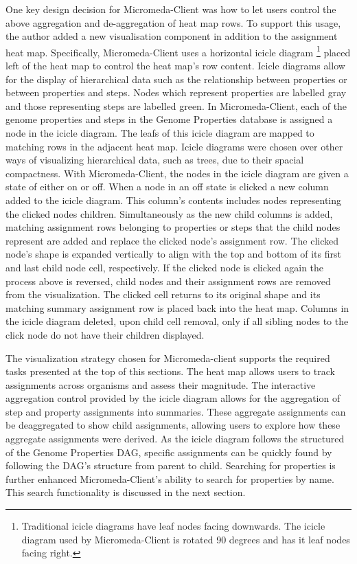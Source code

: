 One key design decision for Micromeda-Client was how to let users control the above aggregation and de-aggregation of heat map rows. To support this usage, the author added a new visualisation component in addition to the assignment heat map. Specifically, Micromeda-Client uses a horizontal icicle diagram \footnote{Traditional icicle diagrams have leaf nodes facing downwards. The icicle diagram used by Micromeda-Client is rotated 90 degrees and has it leaf nodes facing right.} placed left of the heat map to control the heat map's row content. Icicle diagrams allow for the display of hierarchical data such as the relationship between properties or between properties and steps. Nodes which represent properties are labelled gray and those representing steps are labelled green. In Micromeda-Client, each of the genome properties and  steps in the Genome Properties database is assigned a node in the icicle diagram. The leafs of this icicle diagram are mapped to matching rows in the adjacent heat map. Icicle diagrams were chosen over other ways of visualizing hierarchical data, such as trees, due to their spacial compactness. With Micromeda-Client, the nodes in the icicle diagram are given a state of either on or off. When a node in an off state is clicked a new column added to the icicle diagram. This column's contents includes nodes representing the clicked nodes children. Simultaneously as the new child columns is added, matching assignment rows belonging to properties or steps that the child nodes represent are added and replace the clicked node's assignment row. The clicked node's shape is expanded vertically to align with the top and bottom of its first and last child node cell, respectively. If the clicked node is clicked again the process above is reversed, child nodes and their assignment rows are removed from the visualization. The clicked cell returns to its original shape and its matching summary assignment row is placed back into the heat map. Columns in the icicle diagram deleted, upon child cell removal, only if all sibling nodes to the click node do not have their children displayed.

The visualization strategy chosen for Micromeda-client supports the required tasks presented at the top of this sections. The heat map allows users to track assignments across organisms and assess their magnitude. The interactive aggregation control provided by the icicle diagram allows for the aggregation of step and property assignments into summaries. These aggregate assignments can be deaggregated to show child assignments, allowing users to explore how these aggregate assignments were derived. As the icicle diagram follows the structured of the Genome Properties DAG, specific assignments can be quickly found by following the DAG's structure from parent to child. Searching for properties is further enhanced Micromeda-Client's ability to search for properties by name. This search functionality is discussed in the next section.

